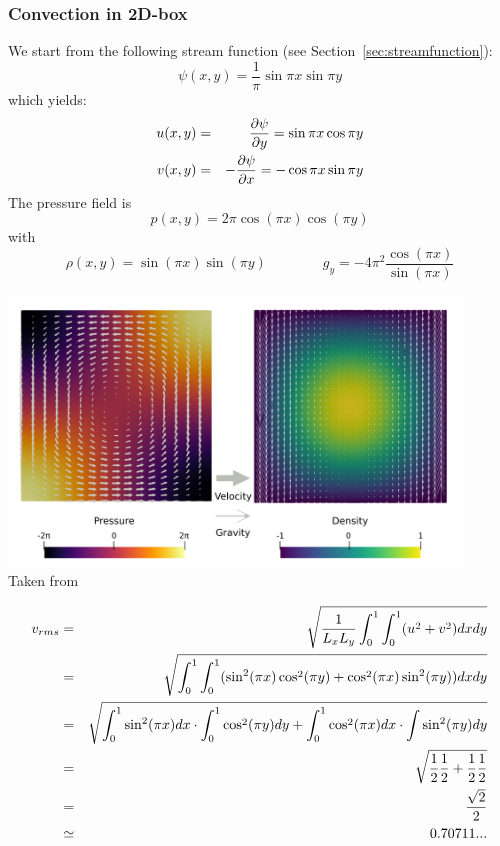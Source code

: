 \subsubsection{Convection in 2D-box} \label{sec:citb}

We start from the following stream function (see Section~\ref{sec:streamfunction}):
\begin{equation}
\psi(x,y)=\frac{1}{\pi} \sin \pi x \sin \pi y
\end{equation}
which yields:
\begin{eqnarray}
u(x,y)&=&\frac{\partial \psi}{\partial y} = \sin \pi x \cos \pi y \nonumber\\
v(x,y)&=&-\frac{\partial \psi}{\partial x} = - \cos \pi x \sin \pi y
\end{eqnarray}
The pressure field is 
\begin{equation}
p(x,y) = 2\pi \cos (\pi x) \cos (\pi y) 
\end{equation}
with 
\begin{equation}
\rho(x,y)=\sin(\pi x) \sin (\pi y)
\qquad\qquad
g_y = -4\pi ^2 \frac{\cos (\pi x)}{\sin (\pi x)}
\end{equation}

\begin{center}
\includegraphics[width=12cm]{images/benchmark_convbox/galb19}\\
{\scriptsize Taken from \cite{galb19}}
\end{center}

\begin{eqnarray}
v_{rms} 
&=& \sqrt{\frac{1}{L_xL_y} \int_0^1 \int_0^1 (u^2+v^2) dxdy} \nonumber\\
&=& \sqrt{\int_0^1 \int_0^1 ( \sin^2 (\pi x) \cos^2 (\pi y) + \cos^2 (\pi x) \sin^2 (\pi y) ) dxdy} \nonumber\\
&=& \sqrt{ \int_0^1 \sin^2 (\pi x) dx  \cdot \int_0^1 \cos^2 (\pi y) dy + \int_0^1 \cos^2 (\pi x) dx \cdot \int \sin^2 (\pi y) dy } \nonumber\\
&=& \sqrt{\frac{1}{2} \frac{1}{2}+ \frac{1}{2} \frac{1}{2} }\nonumber\\
&=& \frac{\sqrt{2}}{2} \nonumber\\
&\simeq& 0.70711...
\end{eqnarray}


